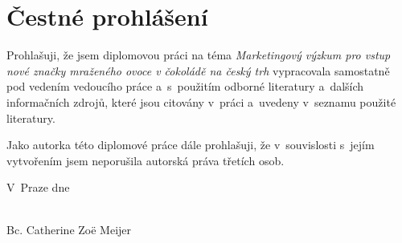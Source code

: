 \chapter*{Čestné prohlášení}

Prohlašuji, že jsem diplomovou práci na téma \emph{Marketingový výzkum pro vstup nové značky mraženého ovoce v čokoládě na český trh} vypracovala samostatně pod vedením vedoucího práce a~s~použitím odborné literatury a~dalších informačních zdrojů, které jsou citovány v~práci a~uvedeny v~seznamu použité literatury.

Jako autorka této diplomové práce dále prohlašuji, že v~souvislosti s~jejím vytvořením jsem neporušila autorská práva třetích osob.

\vspace{30mm}

\noindent V~Praze dne \makebox[4cm]{\dotfill}

\hfill\parbox{6cm}{%
  \centering
  \makebox[5cm]{\dotfill}\\
  Bc. Catherine Zoë Meijer
}

\newpage
